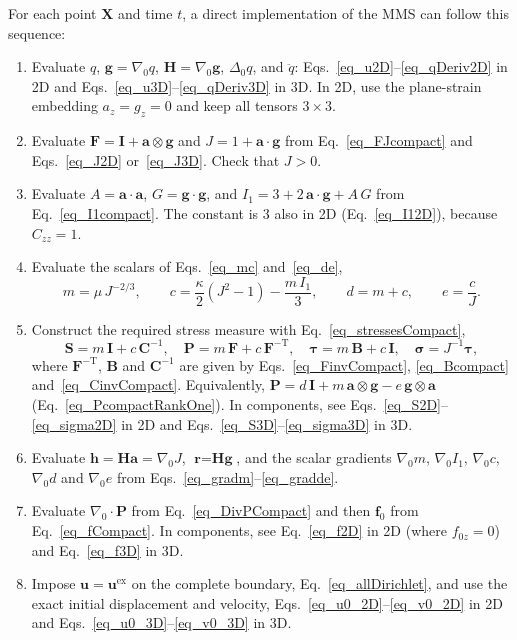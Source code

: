 \documentclass[11pt,a4paper]{article}
\newcommand{\Grad}{\nabla}
\newcommand{\Id}{\textbf{I}}
\begin{document}
For each point $\textbf{X}$ and time $t$, a direct implementation of the MMS can follow this sequence:
\begin{enumerate}
%
\item Evaluate $q$, $\textbf{g}=\Grad_0 q$, $\textbf{H}=\Grad_0\textbf{g}$, $\Delta_0 q$, and $\ddot q$: Eqs.~\eqref{eq_u2D}--\eqref{eq_qDeriv2D} in 2D and Eqs.~\eqref{eq_u3D}--\eqref{eq_qDeriv3D} in 3D. In 2D, use the plane-strain embedding $a_z=g_z=0$ and keep all tensors $3\times3$.
%
\item Evaluate $\textbf{F}=\Id+\textbf{a}\otimes\textbf{g}$ and $J=1+\textbf{a}\cdot\textbf{g}$ from Eq.~\eqref{eq_FJcompact} and Eqs.~\eqref{eq_J2D} or~\eqref{eq_J3D}. Check that $J>0$.
%
\item Evaluate $A=\textbf{a}\cdot\textbf{a}$, $G=\textbf{g}\cdot\textbf{g}$, and $I_1=3+2\,\textbf{a}\cdot\textbf{g}+A\,G$ from Eq.~\eqref{eq_I1compact}. The constant is $3$ also in 2D (Eq.~\eqref{eq_I12D}), because $C_{zz}=1$.
%
\item Evaluate the scalars of Eqs.~\eqref{eq_mc} and~\eqref{eq_de},
%
$$
m=\mu\,J^{-2/3},
\qquad
c=\dfrac{\kappa}{2}(J^2-1)-\dfrac{m\,I_1}{3},
\qquad
d=m+c,
\qquad
e=\dfrac{c}{J}.
$$
\item Construct the required stress measure with Eq.~\eqref{eq_stressesCompact},
%
$$
\textbf{S}=m\,\Id+c\,\textbf{C}^{-1},\quad
\textbf{P}=m\,\textbf{F}+c\,\textbf{F}^{-\text{T}},\quad
\boldsymbol{\tau}=m\,\textbf{B}+c\,\Id,\quad
\boldsymbol{\sigma}=J^{-1}\boldsymbol{\tau},
$$
%
where $\textbf{F}^{-\text{T}}$, $\textbf{B}$ and $\textbf{C}^{-1}$ are given by Eqs.~\eqref{eq_FinvCompact}, \eqref{eq_Bcompact} and~\eqref{eq_CinvCompact}. Equivalently, $\textbf{P}=d\,\Id+m\,\textbf{a}\otimes\textbf{g}-e\,\textbf{g}\otimes\textbf{a}$ (Eq.~\eqref{eq_PcompactRankOne}). In components, see Eqs.~\eqref{eq_S2D}--\eqref{eq_sigma2D} in 2D and Eqs.~\eqref{eq_S3D}--\eqref{eq_sigma3D} in 3D.
%
\item Evaluate $\textbf{h}=\textbf{H}\textbf{a}=\Grad_0 J$, $\textbf{r}=\textbf{H}\textbf{g}$, and the scalar gradients $\Grad_0 m$, $\Grad_0 I_1$, $\Grad_0 c$, $\Grad_0 d$ and $\Grad_0 e$ from Eqs.~\eqref{eq_gradm}--\eqref{eq_gradde}.
%
\item Evaluate $\Grad_0\cdot\textbf{P}$ from Eq.~\eqref{eq_DivPCompact} and then $\textbf{f}_0$ from Eq.~\eqref{eq_fCompact}. In components, see Eq.~\eqref{eq_f2D} in 2D (where $f_{0z}=0$) and Eq.~\eqref{eq_f3D} in 3D.
%
\item Impose $\textbf{u}=\textbf{u}^{\text{ex}}$ on the complete boundary, Eq.~\eqref{eq_allDirichlet}, and use the exact initial displacement and velocity, Eqs.~\eqref{eq_u0_2D}--\eqref{eq_v0_2D} in 2D and Eqs.~\eqref{eq_u0_3D}--\eqref{eq_v0_3D} in 3D.
%
\end{enumerate}
\end{document}
